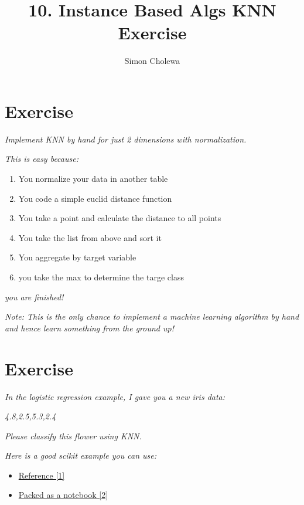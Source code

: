 \documentclass[11pt,a4paper]{article}
\author{Simon Cholewa}
\title{10. Instance Based Algs KNN Exercise}
\begin{document}
\maketitle

\section{Exercise}

\textit{Implement KNN by hand for just 2 dimensions with normalization.}

\textit{This is easy because:}

\begin{enumerate}
	\item You normalize your data in another table
	\item You code a simple euclid distance function
	\item You take a point and calculate the distance to all points
	\item You take the list from above and sort it
	\item You aggregate by target variable
	\item you take the max to determine the targe class
\end{enumerate}

\textit{you are finished!}

\textit{Note: This is the only chance to implement a machine learning algorithm by hand and hence learn something from the ground up!} 


\section{Exercise}

\textit{In the logistic regression example, I gave you a new iris data:}

\textit{4.8,2.5,5.3,2.4}

\textit{Please classify this flower using KNN.}

\textit{Here is a good scikit example you can use: }

\begin{itemize}
	\item \hyperref{https://www.python-course.eu/k_nearest_neighbor_classifier.php}{}{}{Reference [1]}
	\item \hyperref{https://drive.google.com/open?id=1DnD_RRAZuanLlJSCmJjRbGtuloZVOirX}{}{}{Packed as a notebook [2]}
\end{itemize}
\end{document}

